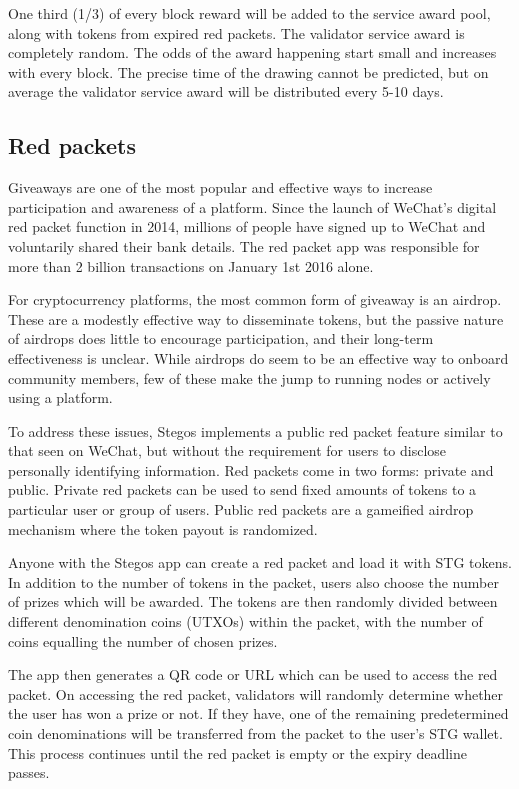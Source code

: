 \documentclass[8pt,fleqn,openany]{book}
\begin{document}
One third (1/3) of every block reward will be added to the service award pool, along with tokens from expired red packets. The validator service award is completely random. The odds of the award happening start small and increases with every block. The precise time of the drawing cannot be predicted, but on average the validator service award will be distributed every 5-10 days.

\subsection{Red packets}\label{sec:red-packets}
Giveaways are one of the most popular and effective ways to increase participation and awareness of a platform. Since the launch of WeChat’s digital red packet function in 2014, millions of people have signed up to WeChat and voluntarily shared their bank details. The red packet app was responsible for more than 2 billion transactions on January 1st 2016 alone.

For cryptocurrency platforms, the most common form of giveaway is an airdrop. These are a modestly effective way to disseminate tokens, but the passive nature of airdrops does little to encourage participation, and their long-term effectiveness is unclear. While airdrops do seem to be an effective way to onboard community members, few of these make the jump to running nodes or actively using a platform.

To address these issues, Stegos implements a public red packet feature similar to that seen on WeChat, but without the requirement for users to disclose personally identifying information. Red packets come in two forms: private and public. Private red packets can be used to send fixed amounts of tokens to a particular user or group of users. Public red packets are a gameified airdrop mechanism where the token payout is randomized.

Anyone with the Stegos app can create a red packet and load it with STG tokens. In addition to the number of tokens in the packet, users also choose the number of prizes which will be awarded. The tokens are then randomly divided between different denomination coins (UTXOs) within the packet, with the number of coins equalling the number of chosen prizes. 

The app then generates a QR code or URL which can be used to access the red packet. On accessing the red packet, validators will randomly determine whether the user has won a prize or not. If they have, one of the remaining predetermined coin denominations will be transferred from the packet to the user’s STG wallet. This process continues until the red packet is empty or the expiry deadline passes.
\end{document}
